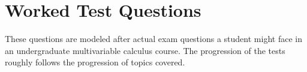 \section{Worked Test Questions}
\noindent
These questions are modeled after actual exam questions a student might face in an undergraduate multivariable calculus course. The progression of the tests roughly follows the progression of topics covered.




